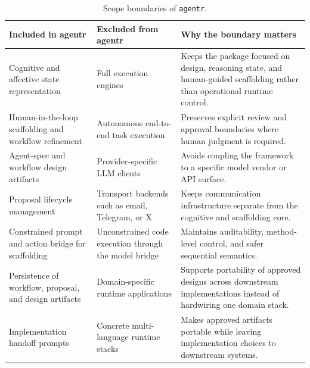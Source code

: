 \begin{table}[htbp]
\centering
\caption{Scope boundaries of \texttt{agentr}.}
\begin{tabular}{p{4.3cm} p{4.3cm} p{6.0cm}}
\hline
\textbf{Included in agentr} & \textbf{Excluded from agentr} & \textbf{Why the boundary matters} \\
\hline
Cognitive and affective state representation & Full execution engines & Keeps the package focused on design, reasoning state, and human-guided scaffolding rather than operational runtime control. \\
Human-in-the-loop scaffolding and workflow refinement & Autonomous end-to-end task execution & Preserves explicit review and approval boundaries where human judgment is required. \\
Agent-spec and workflow design artifacts & Provider-specific LLM clients & Avoids coupling the framework to a specific model vendor or API surface. \\
Proposal lifecycle management & Transport backends such as email, Telegram, or X & Keeps communication infrastructure separate from the cognitive and scaffolding core. \\
Constrained prompt and action bridge for scaffolding & Unconstrained code execution through the model bridge & Maintains auditability, method-level control, and safer sequential semantics. \\
Persistence of workflow, proposal, and design artifacts & Domain-specific runtime applications & Supports portability of approved designs across downstream implementations instead of hardwiring one domain stack. \\
Implementation handoff prompts & Concrete multi-language runtime stacks & Makes approved artifacts portable while leaving implementation choices to downstream systems. \\
\hline
\end{tabular}
\end{table}
